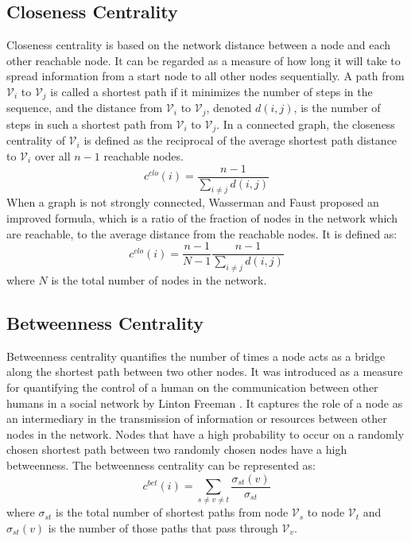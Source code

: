 \documentclass[\main/thesis.tex]{subfiles}
\begin{document}
\subsection{Closeness Centrality}
Closeness centrality \cite{freeman1978centrality} is based on the network distance between a node and each other reachable node. It can be regarded as a measure of how long it will take to spread information from a start node to all other nodes sequentially. A path from $\mathcal{V}_i$ to $\mathcal{V}_j$ is called a shortest path if it minimizes the number of steps in the sequence, and the distance from $\mathcal{V}_i$ to $\mathcal{V}_j$, denoted $d(i,j)$, is the number of steps in such a shortest path from $\mathcal{V}_i$ to $\mathcal{V}_j$. In a connected graph, the closeness centrality of $\mathcal{V}_i$ is defined as the reciprocal of the average shortest path distance to $\mathcal{V}_i$ over all $n-1$ reachable nodes.
\begin{equation}
c^{clo}(i) = \frac{n-1}{\sum_{i\neq j}d(i,j)}
\end{equation}
When a graph is not strongly connected, Wasserman and Faust \cite{wasserman1994social} proposed an improved formula, which is a ratio of the fraction of nodes in the network which are reachable, to the average distance from the reachable nodes. It is defined as:
\begin{equation}
c^{clo}(i) = \frac{n-1}{N-1}\frac{n-1}{\sum_{i\neq j}d(i,j)}
\end{equation}
where $N$ is the total number of nodes in the network.

\subsection{Betweenness Centrality}
Betweenness centrality quantifies the number of times a node acts as a bridge along the shortest path between two other nodes. It was introduced as a measure for quantifying the control of a human on the communication between other humans in a social network by Linton Freeman \cite{freeman1977set}. It captures the role of a node as an intermediary in the transmission of information or resources between other nodes in the network. Nodes that have a high probability to occur on a randomly chosen shortest path between two randomly chosen nodes have a high betweenness. The betweenness centrality can be represented as:
\begin{equation}
c^{bet}(i) = \sum_{s\neq v \neq t}\frac{\sigma_{st}(v)}{\sigma_{st}}
\end{equation}
where $\sigma_{st}$ is the total number of shortest paths from node $\mathcal{V}_s$ to node $\mathcal{V}_t$ and $\sigma_{st}(v)$ is the number of those paths that pass through $\mathcal{V}_v$.
\end{document}
